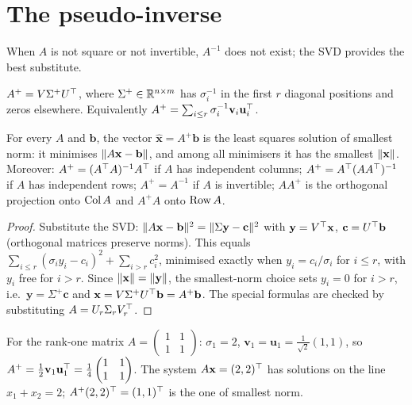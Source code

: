 \section{The pseudo-inverse}

When $A$ is not square or not invertible, $A^{-1}$ does not exist; the SVD provides the best substitute.

\begin{definition}
$A^+=V\Sigma^+U^{\top}$, where $\Sigma^+\in\mathbb{R}^{n\times m}$ has $\sigma_i^{-1}$ in the first $r$ diagonal positions and zeros elsewhere. Equivalently $A^+=\sum_{i\le r}\sigma_i^{-1}\mathbf{v}_i\mathbf{u}_i^{\top}$.
\end{definition}

\begin{theorem}\label{thm:pinv}
For every $A$ and $\mathbf{b}$, the vector $\hat{\mathbf{x}}=A^+\mathbf{b}$ is the least squares solution of smallest norm: it minimises $\lVert A\mathbf{x}-\mathbf{b}\rVert$, and among all minimisers it has the smallest $\lVert\mathbf{x}\rVert$. Moreover: $A^+=(A^{\top} A)^{-1}A^{\top}$ if $A$ has independent columns; $A^+=A^{\top}(AA^{\top})^{-1}$ if $A$ has independent rows; $A^+=A^{-1}$ if $A$ is invertible; $AA^+$ is the orthogonal projection onto $\operatorname{Col} A$ and $A^+A$ onto $\operatorname{Row} A$.
\end{theorem}

\begin{proof}
Substitute the SVD: $\lVert A\mathbf{x}-\mathbf{b}\rVert^2=\lVert\Sigma\mathbf{y}-\mathbf{c}\rVert^2$ with $\mathbf{y}=V^{\top}\mathbf{x}$, $\mathbf{c}=U^{\top}\mathbf{b}$ (orthogonal matrices preserve norms). This equals $\sum_{i\le r}(\sigma_iy_i-c_i)^2+\sum_{i>r}c_i^2$, minimised exactly when $y_i=c_i/\sigma_i$ for $i\le r$, with $y_i$ free for $i>r$. Since $\lVert\mathbf{x}\rVert=\lVert\mathbf{y}\rVert$, the smallest-norm choice sets $y_i=0$ for $i>r$, i.e.\ $\mathbf{y}=\Sigma^+\mathbf{c}$ and $\mathbf{x}=V\Sigma^+U^{\top}\mathbf{b}=A^+\mathbf{b}$. The special formulas are checked by substituting $A=U_r\Sigma_rV_r^{\top}$.
\end{proof}

\begin{example}
For the rank-one matrix $A=\begin{pmatrix}1&1\\1&1\end{pmatrix}$: $\sigma_1=2$, $\mathbf{v}_1=\mathbf{u}_1=\frac1{\sqrt2}(1,1)$, so $A^+=\frac12\mathbf{v}_1\mathbf{u}_1^{\top}=\frac14\begin{pmatrix}1&1\\1&1\end{pmatrix}$. The system $A\mathbf{x}=(2,2)^{\top}$ has solutions on the line $x_1+x_2=2$; $A^+(2,2)^{\top}=(1,1)^{\top}$ is the one of smallest norm.
\end{example}

